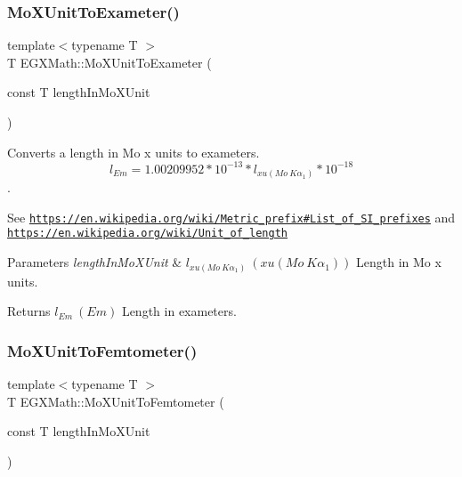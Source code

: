 \subsubsection{\texorpdfstring{Mo\+X\+Unit\+To\+Exameter()}{MoXUnitToExameter()}}
{\footnotesize\ttfamily template$<$typename T $>$ \\
T E\+G\+X\+Math\+::\+Mo\+X\+Unit\+To\+Exameter (\begin{DoxyParamCaption}\item[{const T}]{length\+In\+Mo\+X\+Unit }\end{DoxyParamCaption})}



Converts a length in Mo x units to exameters. \[ l_{Em}=1.00209952*10^{-13} * l_{xu(Mo\ K\alpha_1)} * 10^{-18} \]. 

See \href{https://en.wikipedia.org/wiki/Metric_prefix#List_of_SI_prefixes}{\tt https\+://en.\+wikipedia.\+org/wiki/\+Metric\+\_\+prefix\#\+List\+\_\+of\+\_\+\+S\+I\+\_\+prefixes} and \href{https://en.wikipedia.org/wiki/Unit_of_length}{\tt https\+://en.\+wikipedia.\+org/wiki/\+Unit\+\_\+of\+\_\+length} 
\begin{DoxyParams}{Parameters}
{\em length\+In\+Mo\+X\+Unit} & $ l_{xu(Mo\ K\alpha_1)}\ (xu(Mo\ K\alpha_1))$ Length in Mo x units. \\
\hline
\end{DoxyParams}
\begin{DoxyReturn}{Returns}
$ l_{Em}\ (Em)$ Length in exameters. 
\end{DoxyReturn}
\mbox{\label{group___e_g_x_math-_conversions-_length_conversions-_non-_s_i-_mo_x_unit-_s_i_ga4ee8e623c653ebdcae1d02ae42714afc}} 
\subsubsection{\texorpdfstring{Mo\+X\+Unit\+To\+Femtometer()}{MoXUnitToFemtometer()}}
{\footnotesize\ttfamily template$<$typename T $>$ \\
T E\+G\+X\+Math\+::\+Mo\+X\+Unit\+To\+Femtometer (\begin{DoxyParamCaption}\item[{const T}]{length\+In\+Mo\+X\+Unit }\end{DoxyParamCaption})}




